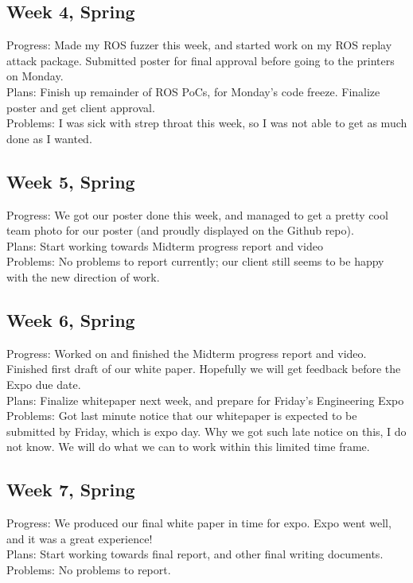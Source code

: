 \documentclass[IEEEtran,letterpaper,10pt,notitlepage,draftclsnofoot,onecolumn]{article}
\begin{document}
\begin{sloppypar}
\subsection{Week 4, Spring}
Progress: Made my ROS fuzzer this week, and started work on my ROS replay attack package. Submitted poster for final approval before going to the printers on Monday. \\
Plans: Finish up remainder of ROS PoCs, for Monday's code freeze. Finalize poster and get client approval. \\
Problems: I was sick with strep throat this week, so I was not able to get as much done as I wanted. \\
\subsection{Week 5, Spring}
Progress: We got our poster done this week, and managed to get a pretty cool team photo for our poster (and proudly displayed on the Github repo). \\
Plans: Start working towards Midterm progress report and video \\
Problems: No problems to report currently; our client still seems to be happy with the new direction of work. \\
\subsection{Week 6, Spring}
Progress: Worked on and finished the Midterm progress report and video. Finished first draft of our white paper. Hopefully we will get feedback before the Expo due date. \\
Plans: Finalize whitepaper next week, and prepare for Friday's Engineering Expo \\
Problems: Got last minute notice that our whitepaper is expected to be submitted by Friday, which is expo day. Why we got such late notice on this, I do not know. We will do what we can to work within this limited time frame. \\
\subsection{Week 7, Spring}
Progress: We produced our final white paper in time for expo. Expo went well, and it was a great experience! \\
Plans: Start working towards final report, and other final writing documents. \\
Problems: No problems to report. \\

\end{sloppypar}
\end{document}
